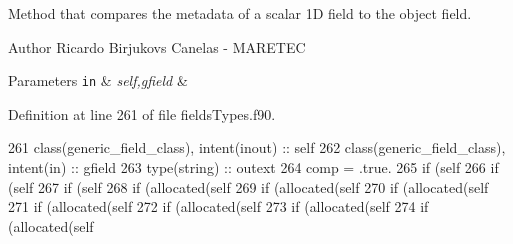 Method that compares the metadata of a scalar 1D field to the object field. 

\begin{DoxyAuthor}{Author}
Ricardo Birjukovs Canelas -\/ M\+A\+R\+E\+T\+EC 
\end{DoxyAuthor}

\begin{DoxyParams}[1]{Parameters}
\mbox{\tt in}  & {\em self,gfield} & \\
\hline
\end{DoxyParams}


Definition at line 261 of file fields\+Types.\+f90.


\begin{DoxyCode}
261     \textcolor{keywordtype}{class}(generic\_field\_class), \textcolor{keywordtype}{intent(inout)} :: self
262     \textcolor{keywordtype}{class}(generic\_field\_class), \textcolor{keywordtype}{intent(in)} :: gfield
263     \textcolor{keywordtype}{type}(string) :: outext
264     comp = .true.
265     \textcolor{keywordflow}{if} (self%
266     \textcolor{keywordflow}{if} (self%
267     \textcolor{keywordflow}{if} (self%
268     \textcolor{keywordflow}{if} (\textcolor{keyword}{allocated}(self%
269     \textcolor{keywordflow}{if} (\textcolor{keyword}{allocated}(self%
270     \textcolor{keywordflow}{if} (\textcolor{keyword}{allocated}(self%
271     \textcolor{keywordflow}{if} (\textcolor{keyword}{allocated}(self%
272     \textcolor{keywordflow}{if} (\textcolor{keyword}{allocated}(self%
273     \textcolor{keywordflow}{if} (\textcolor{keyword}{allocated}(self%
274     \textcolor{keywordflow}{if} (\textcolor{keyword}{allocated}(self%
\end{DoxyCode}
\mbox{\label{namespacefieldtypes__mod_a67cc0dfdc7206a2769746ff7879a4375}} 
